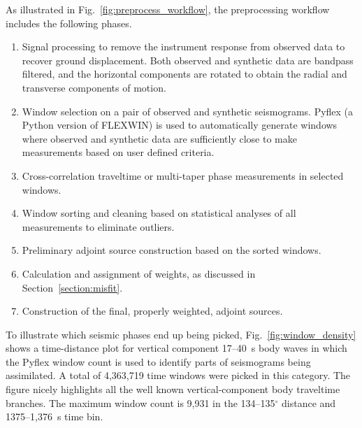 \documentclass[extra,mreferee]{gji}
\begin{document}
As illustrated in Fig.~\ref{fig:preprocess_workflow}, the preprocessing workflow
includes the following phases.
\begin{enumerate}
  \item Signal processing to remove the instrument response from observed data
    to recover ground displacement. Both observed and synthetic data are bandpass
    filtered, and the horizontal components are rotated to obtain the radial and transverse components of motion.
  \item Window selection on a pair of
    observed and synthetic seismograms. Pyflex (a Python version
    of FLEXWIN) is
    used to automatically generate windows where observed and
    synthetic data are sufficiently close to make measurements based on user defined
    criteria.
  \item Cross-correlation traveltime or multi-taper phase measurements in selected windows.
  \item Window sorting and cleaning based on statistical analyses of all measurements to eliminate outliers.
  \item Preliminary adjoint source construction based on the sorted windows.
  \item Calculation and assignment of weights, as discussed in Section~\ref{section:misfit}.
  \item Construction of the final, properly weighted, adjoint sources.
\end{enumerate}

To illustrate which seismic phases end up being picked,
Fig.~\ref{fig:window_density} shows a time-distance plot
for vertical component 17--40~s body waves in which the Pyflex window count is used to identify parts of seismograms being assimilated.
A total of 4,363,719 time windows were picked in this category.
The figure nicely highlights all the well known vertical-component body traveltime branches.
The maximum window count is 9,931 in the 134--135$^\circ$ distance and 1375--1,376~s time bin.
\end{document}
